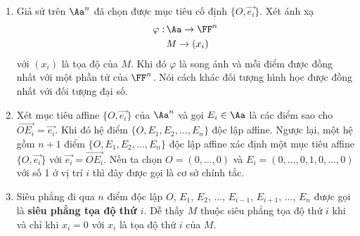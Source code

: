 \begin{enumerate}
    \item Giả sử trên $\Aa^n$ đã chọn được mục tiêu cố định $\{O, \overrightarrow{e_i}\}$. Xét ánh xạ 
    \begin{align*}
        \varphi: \, & \Aa \to \FF^n \\ & M \to (x_i)
    \end{align*}
    với $(x_i)$ là tọa độ của $M$. Khi đó $\varphi$ là song ánh và mỗi điểm được đồng nhất với một phần tử của $\FF^n$. Nói cách khác đối tượng hình học được đồng nhất với đối tượng đại số.
    \item Xét mục tiêu affine $\{O, \overrightarrow{e_i}\}$ của $\Aa^n$ và gọi $E_i \in \Aa$ là các điểm sao cho $\overrightarrow{OE_i} = \overrightarrow{e_i}$. Khi đó hệ điểm $\{O, E_1, E_2, \ldots, E_n\}$ độc lập affine. Ngược lại, một hệ gồm $n+1$ điểm $\{O, E_1, E_2, \ldots, E_n\}$ độc lập affine xác định một mục tiêu affine $\{O, \overrightarrow{e_i}\}$ với $\overrightarrow{e_i} = \overrightarrow{OE_i}$. Nếu ta chọn $O = (0, \ldots, 0)$ và $E_i = (0, \ldots, 0, 1, 0, \ldots, 0)$ với số 1 ở vị trí $i$ thì đây được gọi là cơ sở chính tắc.
    \item Siêu phẳng đi qua $n$ điểm độc lập $O$, $E_1$, $E_2$, ..., $E_{i-1}$, $E_{i+1}$, ..., $E_n$ được gọi là \textbf{siêu phẳng tọa độ thứ $i$}. Dễ thấy $M$ thuộc siêu phẳng tọa độ thứ $i$ khi và chỉ khi $x_i = 0$ với $x_i$ là tọa độ thứ $i$ của $M$.
\end{enumerate}